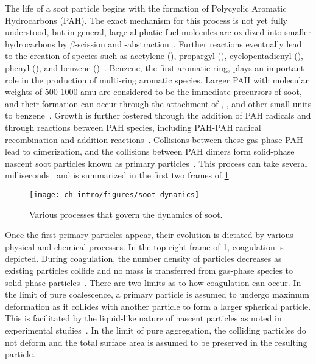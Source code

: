 The life of a soot particle begins with the formation of Polycyclic Aromatic Hydrocarbons (PAH). The exact mechanism for this process is not yet fully understood, but in general, large aliphatic fuel molecules are oxidized into smaller hydrocarbons by $\beta$-scission and -abstraction~\cite{law2006}. Further reactions eventually lead to the creation of species such as acetylene (), propargyl (), cyclopentadienyl (), phenyl (), and benzene ()~\cite{wang1997,richter2000,wang2011}. Benzene, the first aromatic ring, plays an important role in the production of multi-ring aromatic species. Larger PAH with molecular weights of 500-1000 amu are considered to be the immediate precursors of soot, and their formation can occur through the attachment of , , and other small units to benzene~\cite{wang1997,richter2000}. Growth is further fostered through the addition of PAH radicals and through reactions between PAH species, including PAH-PAH radical recombination and addition reactions~\cite{richter2000,wang2011}. Collisions between these gas-phase PAH lead to dimerization, and the collisions between PAH dimers form solid-phase nascent soot particles known as primary particles~\cite{frenklach1991,richter2000,schuetz2002,blanquart2009,wang2011}. This process can take several milliseconds~\cite{richter2000,wang2011} and is summarized in the first two frames of \cref{fig:intro:dynamics:sootdynamics}.

\begin{figure}[htb]
  \centering
  \texttt{[image: ch-intro/figures/soot-dynamics]}
  \caption[Dynamics of Soot]{Various processes that govern the dynamics of soot.}
  \label{fig:intro:dynamics:sootdynamics}
\end{figure}

Once the first primary particles appear, their evolution is dictated by various physical and chemical processes. In the top right frame of \cref{fig:intro:dynamics:sootdynamics}, coagulation is depicted. During coagulation, the number density of particles decreases as existing particles collide and no mass is transferred from gas-phase species to solid-phase particles~\cite{kazakov1995,hmom2009}. There are two limits as to how coagulation can occur. In the limit of pure coalescence, a primary particle is assumed to undergo maximum deformation as it collides with another particle to form a larger spherical particle. This is facilitated by the liquid-like nature of nascent particles as noted in experimental studies~\cite{dobbins1998,dobbins2002}. In the limit of pure aggregation, the colliding particles do not deform and the total surface area is assumed to be preserved in the resulting particle.

